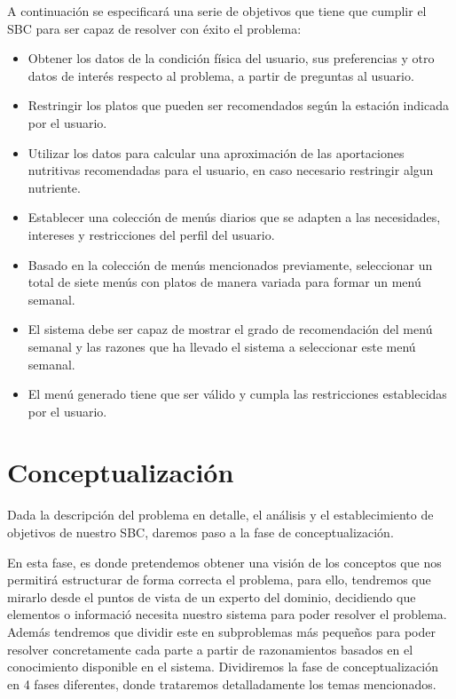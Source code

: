 \documentclass[11pt]{article}
\begin{document}
A continuación se especificará una serie de objetivos que tiene que cumplir el SBC para ser capaz de resolver con éxito el problema:
\begin{itemize}
    \item Obtener los datos de la condición física del usuario, sus preferencias y otro datos de interés respecto al problema, a partir de preguntas al usuario.
    \item Restringir los platos que pueden ser recomendados según la estación indicada por el usuario.
    \item Utilizar los datos para calcular una aproximación de las aportaciones nutritivas recomendadas para el usuario, en caso necesario restringir algun nutriente.
    \item Establecer una colección de menús diarios que se adapten a las necesidades, intereses y restricciones del perfil del usuario.
    \item Basado en la colección de menús mencionados previamente, seleccionar un total de siete menús con platos de manera variada para formar un menú semanal.
    \item El sistema debe ser capaz de mostrar el grado de recomendación del menú semanal y las razones que ha llevado el sistema a seleccionar este menú semanal.
    \item El menú generado tiene que ser válido y cumpla las restricciones establecidas por el usuario.
\end{itemize}

\newpage
\section{Conceptualización}

Dada la descripción del problema en detalle, el análisis y el establecimiento de objetivos de nuestro SBC, daremos paso a la fase de conceptualización.

En esta fase, es donde pretendemos obtener una visión de los conceptos que nos permitirá estructurar de forma correcta el problema, para ello, tendremos que mirarlo desde el puntos de vista de un experto del dominio, decidiendo que elementos o informació necesita nuestro sistema para poder resolver el problema. Además tendremos que dividir este en subproblemas más pequeños para poder resolver concretamente cada parte a partir de razonamientos basados en el conocimiento disponible en el sistema. Dividiremos la fase de conceptualización en 4 fases diferentes, donde trataremos detalladamente los temas mencionados.
\end{document}

